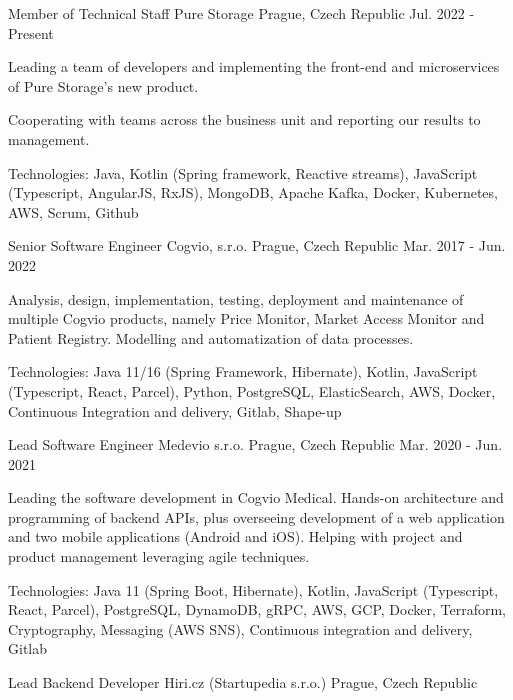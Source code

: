 \begin{cventries}
  \cventry
    {Member of Technical Staff}
    {Pure Storage}
    {Prague, Czech Republic}
    {Jul. 2022 - Present}
    {
    \begin{cvitems}
      \item {Leading a team of developers and implementing the front-end and microservices of Pure Storage's new product.}
      \item {Cooperating with teams across the business unit and reporting our results to management.}
      \item {Technologies: Java, Kotlin (Spring framework, Reactive streams), JavaScript (Typescript, AngularJS, RxJS), MongoDB, Apache Kafka, Docker, Kubernetes, AWS, Scrum, Github}
    \end{cvitems}
  }
  \cventry
    {Senior Software Engineer}
    {Cogvio, s.r.o.}
    {Prague, Czech Republic}
    {Mar. 2017 - Jun. 2022}
    {
    \begin{cvitems}
      \item {Analysis, design, implementation, testing, deployment and maintenance of multiple Cogvio products, namely Price Monitor, Market Access Monitor and Patient Registry. Modelling and automatization of data processes.}
      \item {Technologies: Java 11/16 (Spring Framework, Hibernate), Kotlin, JavaScript (Typescript, React, Parcel), Python, PostgreSQL, ElasticSearch, AWS, Docker, Continuous Integration and delivery, Gitlab, Shape-up}
    \end{cvitems}
  }
  \cventry
    {Lead Software Engineer}
    {Medevio s.r.o.}
    {Prague, Czech Republic}
    {Mar. 2020 - Jun. 2021}
    {
    \begin{cvitems}
      \item {Leading the software development in Cogvio Medical. Hands-on architecture and programming of backend APIs, plus overseeing development of a web application and two mobile applications (Android and iOS).
       Helping with project and product management leveraging agile techniques.}
      \item {Technologies: Java 11 (Spring Boot, Hibernate), Kotlin, JavaScript (Typescript, React, Parcel), PostgreSQL, DynamoDB, gRPC, AWS, GCP, Docker, Terraform, Cryptography, Messaging (AWS SNS), Continuous integration and delivery, Gitlab}
    \end{cvitems}
  }
  \cventry
    {Lead Backend Developer}
    {Hiri.cz (Startupedia s.r.o.)}
    {Prague, Czech Republic}

\end{cventries}
